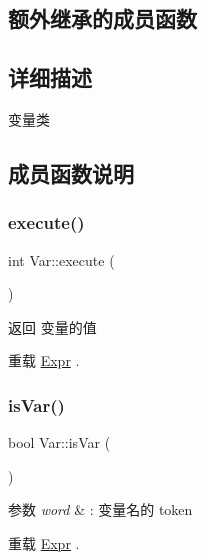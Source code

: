 \subsection*{额外继承的成员函数}


\subsection{详细描述}
变量类 

\subsection{成员函数说明}
\mbox{\label{class_var_a9dc96e803f7b0f9aa519c2c0e0a6bd8f}} 
\subsubsection{\texorpdfstring{execute()}{execute()}}
{\footnotesize\ttfamily int Var\+::execute (\begin{DoxyParamCaption}{ }\end{DoxyParamCaption})\hspace{0.3cm}{\ttfamily [virtual]}}

\begin{DoxyReturn}{返回}
变量的值 
\end{DoxyReturn}


重载 \hyperlink{class_expr_aff6a2e6eaa460e2a3db28ebdab089b51}{Expr} .

\mbox{\label{class_var_a50aa6f54310903a8bc36184813a2b9ef}} 
\subsubsection{\texorpdfstring{is\+Var()}{isVar()}}
{\footnotesize\ttfamily bool Var\+::is\+Var (\begin{DoxyParamCaption}{ }\end{DoxyParamCaption})\hspace{0.3cm}{\ttfamily [virtual]}}


\begin{DoxyParams}{参数}
{\em word} & \+: 变量名的 token \\
\hline
\end{DoxyParams}


重载 \hyperlink{class_expr}{Expr} .



